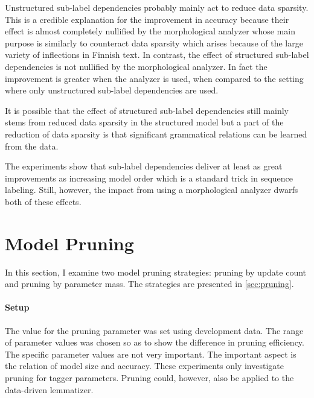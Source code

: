 Unstructured sub-label dependencies probably mainly act to reduce data
sparsity. This is a credible explanation for the improvement in
accuracy because their effect is almost completely nullified by the
morphological analyzer whose main purpose is similarly to counteract data
sparsity which arises because of the large variety of inflections in
Finnish text. In contrast, the effect of structured sub-label
dependencies is not nullified by the morphological analyzer. In fact
the improvement is greater when the analyzer is used, when compared to
the setting where only unstructured sub-label dependencies are used. 

It is possible that the effect of structured sub-label dependencies
still mainly stems from reduced data sparsity in the structured model
but a part of the reduction of data sparsity is that significant
grammatical relations can be learned from the data.

The experiments show that sub-label dependencies deliver at least as
great improvements as increasing model order which is a standard trick
in sequence labeling. Still, however, the impact from using a
morphological analyzer dwarfs both of these effects.

\section{Model Pruning}

In this section, I examine two model pruning strategies: pruning by
update count and pruning by parameter mass. The strategies are
presented in \ref{sec:pruning}.

\paragraph{Setup} The value for the pruning parameter was set using
development data. The range of parameter values was chosen so as to
show the difference in pruning efficiency. The specific parameter
values are not very important. The important aspect is the relation of
model size and accuracy. These experiments only investigate pruning
for tagger parameters. Pruning could, however, also be applied to the
data-driven lemmatizer.

